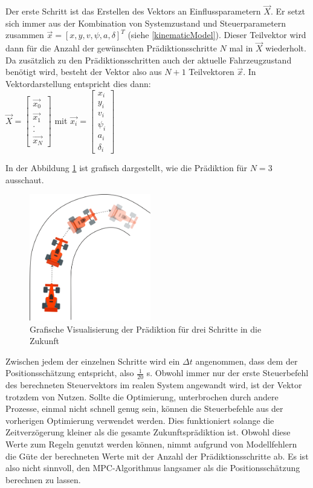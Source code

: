 \documentclass{like}
\begin{document}
Der erste Schritt ist das Erstellen des Vektors an Einflussparametern $\vec{X}$. Er setzt sich immer aus der Kombination von Systemzustand und Steuerparametern zusammen  $\vec{x} = [x, y, v, \psi, a, \delta ]^T $ (siehe \ref{kinematicModel}). 
Dieser Teilvektor wird dann für die Anzahl der gewünschten Prädiktionsschritte \(N\) mal in $\vec{X}$ wiederholt. 
Da zusätzlich zu den Prädiktionsschritten auch der aktuelle Fahrzeugzustand benötigt wird, besteht der Vektor also aus $N+1$ Teilvektoren $\vec{x}$. In Vektordarstellung entspricht dies dann: \\
$
\vec{X} = 
\begin{bmatrix}
\vec{x_0} \\ \vec{x_1} \\ . \\ . \\ \vec{x_N}
\end{bmatrix}
$ mit  $ \vec{x_i} = \begin{bmatrix}
x_i \\ y_i \\ v_i \\ \psi_i \\ a_i \\ \delta_i 
\end{bmatrix} $

 In der Abbildung \ref{fig:predictionMpc} ist grafisch dargestellt, wie die Prädiktion für $N=3$ ausschaut.
\begin{figure}[ht!]
	\centering
	\includegraphics[width=150pt]{Abbildungen/predictionMPC.png}
	\caption{Grafische Visualisierung der Prädiktion für drei Schritte in die Zukunft}
	\label{fig:predictionMpc}
\end{figure}
Zwischen jedem der einzelnen Schritte wird ein $\Delta t$ angenommen, dass dem der Positions\-schät\-zung entspricht, also $\frac{1}{20}$ s. Obwohl immer nur der erste Steuerbefehl des berechneten Steuer\-vek\-tors im realen System angewandt wird, ist der Vektor trotzdem von Nutzen. Sollte die Op\-ti\-mie\-rung, unterbrochen durch andere Prozesse, einmal nicht schnell genug sein, können die Steuer\-be\-feh\-le aus der vorherigen Optimierung verwendet werden. Dies funktioniert solange die Zeit\-ver\-zö\-ger\-ung kleiner als die gesamte Zukunftsprädiktion ist. Obwohl diese Werte zum Regeln genutzt werden können, nimmt aufgrund von Modellfehlern die Güte der berechneten Werte mit der Anzahl der Prädiktionsschritte ab. Es ist also nicht sinnvoll, den \ac{MPC}-Algorithmus langsamer als die Positions\-schät\-zung berechnen zu lassen. 
\end{document}
